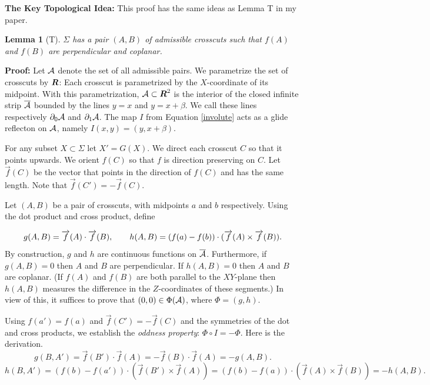 \documentclass[12pt]{article}
\newtheorem{lemma}[theorem]{Lemma}
\def\startproof{{\bf {\medskip}{\noindent}Proof: }}
\def\R{\mbox{\boldmath{$R$}}}%
\begin{document}
\noindent
{\bf The Key Topological Idea:\/}
This proof has the same ideas as Lemma T in my paper.

\begin{lemma}[T]
  $\Sigma$ has a pair $(A,B)$ of admissible crosscuts such that
  $f(A)$ and $f(B)$ are perpendicular and coplanar.
\end{lemma}

\startproof
Let $\cal A$ denote the set of all admissible pairs.
We parametrize the set of crosscuts by $\R$:  Each crosscut is
parametrized by the $X$-coordinate of its midpoint.
With this parametrization,
${\cal A\/} \subset \R^2$ is the interior of the closed infinite strip $\overline{\cal A}$
bounded by the lines $y=x$ and $y=x+\beta$.  We call these
lines respectively
$\partial_0{\cal A}$ and $\partial_1{\cal A\/}$.
The map $I$ from Equation \ref{involute} acts as a glide reflecton on
$\cal A$, namely $I(x,y)=(y,x+\beta)$.

For any subset $X \subset \Sigma$ let $X'=G(X)$.
We direct each crosscut $C$ so that it points upwards.
We orient $f(C)$ so that $f$ is direction preserving on $C$.
Let $\overrightarrow f(C)$ be the vector that points in the
direction of $f(C)$ and has the same length.  Note
that $\overrightarrow f(C')=-\overrightarrow f(C)$.

Let $(A,B)$ be a pair of crosscuts, with midpoints $a$ and $b$
respectively.
Using the dot product and cross
product, define

\begin{equation}
  \label{def}
  g(A,B)=\overrightarrow f(A) \cdot \overrightarrow f(B), \hskip 20 pt
  h(A,B)= (f(a)-f(b)) \cdot (\overrightarrow f(A) \times \overrightarrow f(B)).
\end{equation}
By construction, $g$ and $h$ are continuous functions on
$\overline{\cal A}$.
Furthermore,  if $g(A,B)=0$ then
$A$ and $B$ are perpendicular.  If
$h(A,B)=0$ then $A$ and $B$ are coplanar.
(If $f(A)$ and $f(B)$ are both parallel to the $XY$-plane then
$h(A,B)$ measures the
difference in the $Z$-coordinates of these segments.)
In view of this, it suffices to prove
that $(0,0) \in \Phi({\cal A\/})$, where $\Phi=(g,h)$.

Using  $f(a')=f(a)$ and  $\overrightarrow
f(C')=-\overrightarrow f(C)$
and the symmetries of the dot and cross products, we establish
the {\it oddness property\/}: 
$\Phi \circ I=-\Phi$.  Here is the derivation.
$$g(B,A')=\overrightarrow f(B') \cdot \overrightarrow f(A)
=-\overrightarrow f(B) \cdot \overrightarrow f(A) =-g(A,B).$$
$$h(B,A')= (f(b)-f(a')) \cdot (\overrightarrow f(B') \times
\overrightarrow f(A))=
(f(b)-f(a)) \cdot (\overrightarrow f(A) \times
\overrightarrow f(B))=-h(A,B).$$
\end{document}

